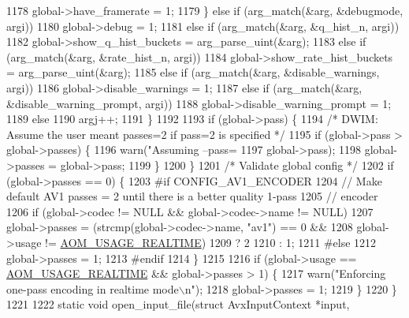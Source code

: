 \begin{DoxyCodeInclude}
{{{{{{{{{{{{{{1178       global->have\_framerate = 1;
1179     \} \textcolor{keywordflow}{else} \textcolor{keywordflow}{if} (arg\_match(&arg, &debugmode, argi))
1180       global->debug = 1;
1181     \textcolor{keywordflow}{else} \textcolor{keywordflow}{if} (arg\_match(&arg, &q\_hist\_n, argi))
1182       global->show\_q\_hist\_buckets = arg\_parse\_uint(&arg);
1183     \textcolor{keywordflow}{else} \textcolor{keywordflow}{if} (arg\_match(&arg, &rate\_hist\_n, argi))
1184       global->show\_rate\_hist\_buckets = arg\_parse\_uint(&arg);
1185     \textcolor{keywordflow}{else} \textcolor{keywordflow}{if} (arg\_match(&arg, &disable\_warnings, argi))
1186       global->disable\_warnings = 1;
1187     \textcolor{keywordflow}{else} \textcolor{keywordflow}{if} (arg\_match(&arg, &disable\_warning\_prompt, argi))
1188       global->disable\_warning\_prompt = 1;
1189     \textcolor{keywordflow}{else}
1190       argj++;
1191   \}
1192 
1193   \textcolor{keywordflow}{if} (global->pass) \{
1194     \textcolor{comment}{/* DWIM: Assume the user meant passes=2 if pass=2 is specified */}
1195     \textcolor{keywordflow}{if} (global->pass > global->passes) \{
1196       warn(\textcolor{stringliteral}{"Assuming --pass=%
1197            global->pass);
1198       global->passes = global->pass;
1199     \}
1200   \}
1201   \textcolor{comment}{/* Validate global config */}
1202   \textcolor{keywordflow}{if} (global->passes == 0) \{
1203 \textcolor{preprocessor}{#if CONFIG\_AV1\_ENCODER}
1204     \textcolor{comment}{// Make default AV1 passes = 2 until there is a better quality 1-pass}
1205     \textcolor{comment}{// encoder}
1206     \textcolor{keywordflow}{if} (global->codec != NULL && global->codec->name != NULL)
1207       global->passes = (strcmp(global->codec->name, \textcolor{stringliteral}{"av1"}) == 0 &&
1208                         global->usage != \hyperlink{group__encoder_gae2cc24d3083099df8eb60ad65f81c62f}{AOM\_USAGE\_REALTIME})
1209                            ? 2
1210                            : 1;
1211 \textcolor{preprocessor}{#else}
1212     global->passes = 1;
1213 \textcolor{preprocessor}{#endif}
1214   \}
1215 
1216   \textcolor{keywordflow}{if} (global->usage == \hyperlink{group__encoder_gae2cc24d3083099df8eb60ad65f81c62f}{AOM\_USAGE\_REALTIME} && global->passes > 1) \{
1217     warn(\textcolor{stringliteral}{"Enforcing one-pass encoding in realtime mode\(\backslash\)n"});
1218     global->passes = 1;
1219   \}
1220 \}
1221 
1222 \textcolor{keyword}{static} \textcolor{keywordtype}{void} open\_input\_file(\textcolor{keyword}{struct} AvxInputContext *input,
}}}}}}}}}}}}}}}
\end{DoxyCodeInclude}
